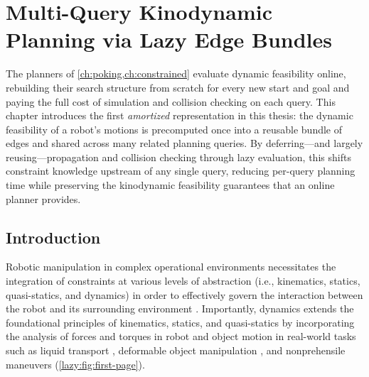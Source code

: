 
\chapter{Multi-Query Kinodynamic Planning via Lazy Edge Bundles}
\label{ch:multiquery}

The planners of \cref{ch:poking,ch:constrained} evaluate dynamic feasibility online, rebuilding their search structure from scratch for every new start and goal and paying the full cost of simulation and collision checking on each query.
This chapter introduces the first \emph{amortized} representation in this thesis: the dynamic feasibility of a robot's motions is precomputed once into a reusable bundle of edges and shared across many related planning queries.
By deferring---and largely reusing---propagation and collision checking through lazy evaluation, this shifts constraint knowledge upstream of any single query, reducing per-query planning time while preserving the kinodynamic feasibility guarantees that an online planner provides.

\section{Introduction}
\label{sec:multiquery:bottleneck}

Robotic manipulation in complex operational environments necessitates the integration of constraints at various levels of abstraction (i.e., kinematics, statics, quasi-statics, and dynamics) in order to effectively govern the interaction between the robot and its surrounding environment \cite{ruggiero2018nonprehensile,mason2018toward}.
Importantly, dynamics extends the foundational principles of kinematics, statics, and quasi-statics by incorporating the analysis of forces and torques in robot and object motion in real-world tasks such as liquid transport \cite{ichnowski2022gomp}, deformable object manipulation \cite{salhotra2022learning}, and nonprehensile maneuvers \cite{pasricha2022pokerrt,jia2019batting} (\cref{lazy:fig:first-page}).

